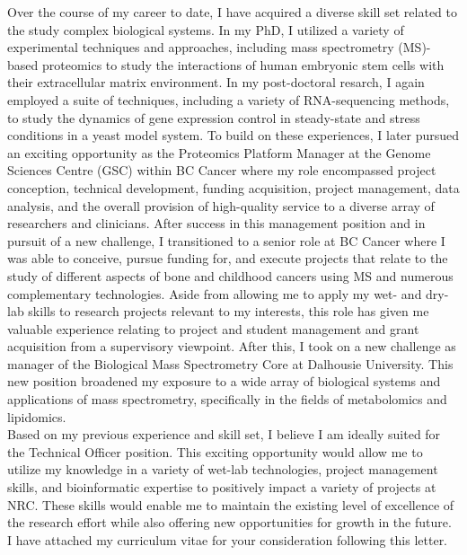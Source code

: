 \documentclass[11pt]{article}
\begin{document}
\noindent
Over the course of my career to date, I have acquired a diverse skill set related to the study complex biological systems. In my PhD, I utilized a variety of experimental techniques and approaches, including mass spectrometry (MS)-based proteomics to study the interactions of human embryonic stem cells with their extracellular matrix environment. In my post-doctoral resarch, I again employed a suite of techniques, including a variety of RNA-sequencing methods, to study the dynamics of gene expression control in steady-state and stress conditions in a yeast model system. To build on these experiences, I later pursued an exciting opportunity as the Proteomics Platform Manager at the Genome Sciences Centre (GSC) within BC Cancer where my role encompassed project conception, technical development, funding acquisition, project management, data analysis, and the overall provision of high-quality service to a diverse array of researchers and clinicians. After success in this management position and in pursuit of a new challenge, I transitioned to a senior role at BC Cancer where I was able to conceive, pursue funding for, and execute projects that relate to the study of different aspects of bone and childhood cancers using MS and numerous complementary technologies. Aside from allowing me to apply my wet- and dry-lab skills to research projects relevant to my interests, this role has given me valuable experience relating to project and student management and grant acquisition from a supervisory viewpoint. After this, I took on a new challenge as manager of the Biological Mass Spectrometry Core at Dalhousie University. This new position broadened my exposure to a wide array of biological systems and applications of mass spectrometry, specifically in the fields of metabolomics and lipidomics.\\

\noindent
Based on my previous experience and skill set, I believe I am ideally suited for the Technical Officer position. This exciting opportunity would allow me to utilize my knowledge in a variety of wet-lab technologies, project management skills, and bioinformatic expertise to positively impact a variety of projects at NRC. These skills would enable me to maintain the existing level of excellence of the research effort while also offering new opportunities for growth in the future.\\

\noindent
I have attached my curriculum vitae for your consideration following this letter.
\end{document}
